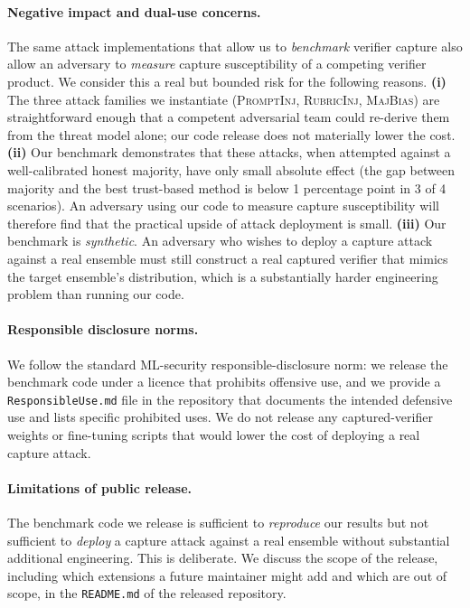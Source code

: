\documentclass[11pt]{article}
\begin{document}
\paragraph{Negative impact and dual-use concerns.}
The same attack implementations that allow us to \emph{benchmark}
verifier capture also allow an adversary to \emph{measure} capture
susceptibility of a competing verifier product. We consider this a
real but bounded risk for the following reasons.
\textbf{(i)} The three attack families we instantiate
(\textsc{PromptInj}, \textsc{RubricInj}, \textsc{MajBias}) are
straightforward enough that a competent adversarial team could
re-derive them from the threat model alone; our code release does
not materially lower the cost.
\textbf{(ii)} Our benchmark demonstrates that these attacks, when
attempted against a well-calibrated honest majority, have only
small absolute effect (the gap between majority and the best
trust-based method is below 1 percentage point in 3 of 4
scenarios). An adversary using our code to measure capture
susceptibility will therefore find that the practical upside of
attack deployment is small.
\textbf{(iii)} Our benchmark is \emph{synthetic}. An adversary who
wishes to deploy a capture attack against a real ensemble must
still construct a real captured verifier that mimics the target
ensemble's distribution, which is a substantially harder engineering
problem than running our code.

\paragraph{Responsible disclosure norms.}
We follow the standard ML-security responsible-disclosure norm: we
release the benchmark code under a licence that prohibits offensive
use, and we provide a \texttt{ResponsibleUse.md} file in the
repository that documents the intended defensive use and lists
specific prohibited uses. We do not release any captured-verifier
weights or fine-tuning scripts that would lower the cost of deploying
a real capture attack.

\paragraph{Limitations of public release.}
The benchmark code we release is sufficient to \emph{reproduce} our
results but not sufficient to \emph{deploy} a capture attack against
a real ensemble without substantial additional engineering. This is
deliberate. We discuss the scope of the release, including which
extensions a future maintainer might add and which are out of scope,
in the \texttt{README.md} of the released repository.
\end{document}
